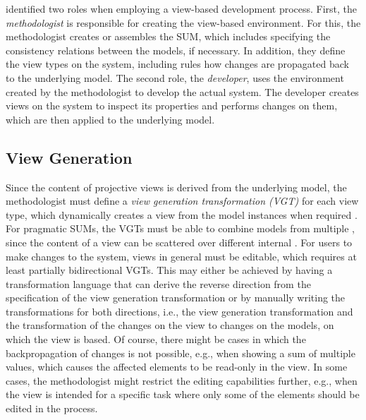 \Textcite{atkinson_orthographic_2010} identified two roles when employing a view-based development process.
First, the \emph{methodologist} is responsible for creating the view-based environment.
For this, the methodologist creates or assembles the SUM, which includes specifying the consistency relations between the models, if necessary.
In addition, they define the view types on the system, including rules how changes are propagated back to the underlying model.
The second role, the \emph{developer}, uses the environment created by the methodologist to develop the actual system.
The developer creates views on the system to inspect its properties and performs changes on them, which are then applied to the underlying model.

\subsection{View Generation}
\label{sec:ViewGeneration}

Since the content of projective views is derived from the underlying model, the methodologist must define a \emph{view generation transformation (VGT)} for each view type, which dynamically creates a view from the model instances when required \autocite{tunjic_synchronization_2015}.
For pragmatic SUMs, the VGTs must be able to combine models from multiple \metamodels, since the content of a view can be scattered over different internal \metamodels \autocite{burger_flexible_2014}.
For users to make changes to the system, views in general must be editable, which requires at least partially bidirectional VGTs.
This may either be achieved by having a transformation language that can derive the reverse direction from the specification of the view generation transformation or by manually writing the transformations for both directions, i.e., the view generation transformation and the transformation of the changes on the view to changes on the models, on which the view is based.
Of course, there might be cases in which the backpropagation of changes is not possible, e.g., when showing a sum of multiple values, which causes the affected elements to be read-only in the view.
In some cases, the methodologist might restrict the editing capabilities further, e.g., when the view is intended for a specific task where only some of the elements should be edited in the process.

